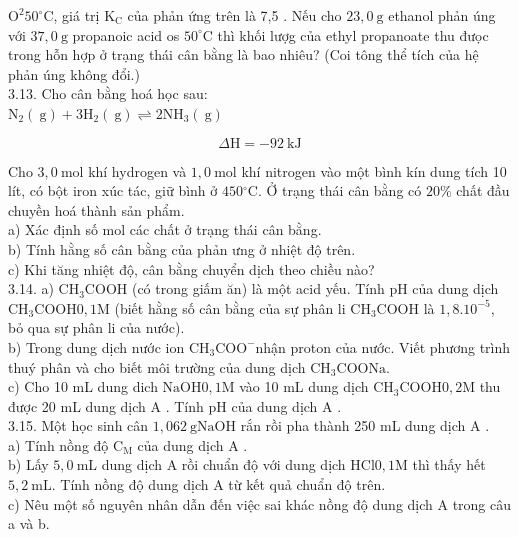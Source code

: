 \documentclass[10pt]{article}
\begin{document}
$\mathrm{O}^{2} 50^{\circ} \mathrm{C}$, giá trị $\mathrm{K}_{\mathrm{C}}$ của phản ứng trên là 7,5 . Nếu cho $23,0 \mathrm{~g}$ ethanol phản úng với $37,0 \mathrm{~g}$ propanoic acid os $50^{\circ} \mathrm{C}$ thì khối lượg của ethyl propanoate thu đưọc trong hỗn hợp ở trạng thái cân bằng là bao nhiêu? (Coi tông thể tích của hệ phản úng không đổi.)\\
3.13. Cho cân bằng hoá học sau:\\
$\mathrm{N}_{2}(\mathrm{~g})+3 \mathrm{H}_{2}(\mathrm{~g}) \rightleftharpoons 2 \mathrm{NH}_{3}(\mathrm{~g})$

$$
\Delta \mathrm{H}=-92 \mathrm{~kJ}
$$

Cho $3,0 \mathrm{~mol}$ khí hydrogen và $1,0 \mathrm{~mol}$ khí nitrogen vào một bình kín dung tích 10 lít, có bột iron xúc tác, giữ bình ở $450{ }^{\circ} \mathrm{C}$. Ở trạng thái cân bằng có $20 \%$ chất đầu chuyền hoá thành sản phẩm.\\
a) Xác định số mol các chất ở trạng thái cân bằng.\\
b) Tính hằng số cân bằng của phản ưng ở nhiệt độ trên.\\
c) Khi tăng nhiệt độ, cân bằng chuyển dịch theo chiều nào?\\
3.14. a) $\mathrm{CH}_{3} \mathrm{COOH}$ (có trong giấm ăn) là một acid yếu. Tính pH của dung dịch $\mathrm{CH}_{3} \mathrm{COOH} 0,1 \mathrm{M}$ (biết hằng số cân bằng của sự phân li $\mathrm{CH}_{3} \mathrm{COOH}$ là $1,8.10^{-5}$, bỏ qua sự phân li của nước).\\
b) Trong dung dịch nước ion $\mathrm{CH}_{3} \mathrm{COO}^{-}$nhận proton của nước. Viết phương trình thuý phân và cho biết môi trường của dung dịch $\mathrm{CH}_{3} \mathrm{COONa}$.\\
c) Cho 10 mL dung dich $\mathrm{NaOH} 0,1 \mathrm{M}$ vào 10 mL dung dịch $\mathrm{CH}_{3} \mathrm{COOH} 0,2 \mathrm{M}$ thu được 20 mL dung dịch A . Tính pH của dung dịch A .\\
3.15. Một học sinh cân $1,062 \mathrm{~g} \mathrm{NaOH}$ rắn rồi pha thành 250 mL dung dịch A .\\
a) Tính nồng độ $\mathrm{C}_{\mathrm{M}}$ của dung dịch A .\\
b) Lấy $5,0 \mathrm{~mL}$ dung dịch A rồi chuẩn độ với dung dịch $\mathrm{HCl} 0,1 \mathrm{M}$ thì thấy hết $5,2 \mathrm{~mL}$. Tính nồng độ dung dịch A từ kết quả chuẩn độ trên.\\
c) Nêu một số nguyên nhân dẫn đến việc sai khác nồng độ dung dịch A trong câu a và b.
\end{document}
